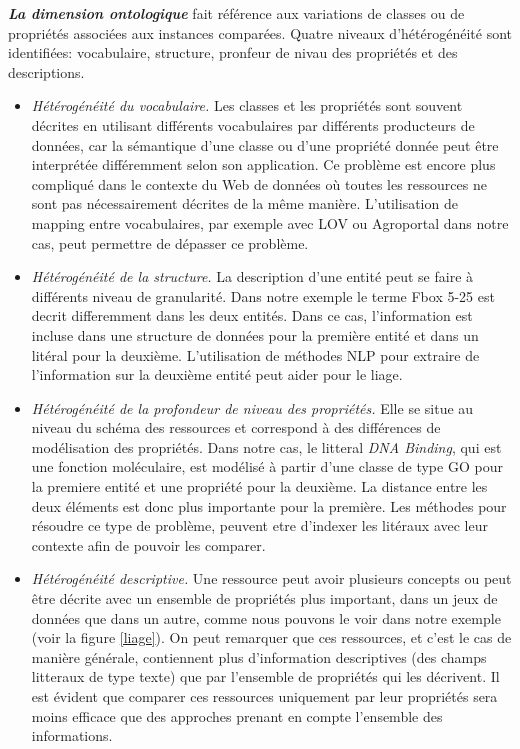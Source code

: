 \textbf{\textit{La dimension ontologique}} fait référence aux variations de classes ou de propriétés associées aux instances comparées. Quatre niveaux d'hétérogénéité sont identifiées: vocabulaire, structure, pronfeur de nivau des propriétés et des descriptions.\\
\begin{itemize}
\item \textit{Hétérogénéité du vocabulaire.} Les classes et les propriétés sont souvent décrites en utilisant différents vocabulaires par différents producteurs de données, car la sémantique d'une classe ou d'une propriété donnée peut être interprétée différemment selon son application. Ce problème est encore plus compliqué dans le contexte du Web de données où toutes les ressources ne sont pas nécessairement décrites de la même manière. L'utilisation de mapping entre vocabulaires, par exemple avec LOV ou Agroportal dans notre cas, peut permettre de dépasser ce problème.\\
\item \textit{Hétérogénéité de la structure.} La description d'une entité peut se faire à différents niveau de granularité. Dans notre exemple le terme Fbox 5-25 est decrit differemment dans les deux entités. Dans ce cas, l'information est incluse dans une structure de données pour la première entité et dans un litéral pour la deuxième. L'utilisation de méthodes NLP pour extraire de l'information sur la deuxième entité peut aider pour le liage.\\
\item \textit{Hétérogénéité de la profondeur de niveau des propriétés.} Elle se situe au niveau du schéma des ressources et correspond à des différences de modélisation des propriétés. Dans notre cas, le litteral \textit{DNA Binding}, qui est une fonction moléculaire, est modélisé à partir d'une classe de type GO pour la premiere entité et une propriété pour la deuxième. La distance entre les deux éléments est donc plus importante pour la première. Les méthodes pour résoudre ce type de problème, peuvent etre d'indexer les litéraux avec leur contexte afin de pouvoir les comparer.\\
\item \textit{Hétérogénéité descriptive.} Une ressource peut avoir plusieurs concepts ou peut être décrite avec un ensemble de propriétés plus important, dans un jeux de données que dans un autre, comme nous pouvons le voir dans notre exemple (voir la figure \ref{liage}). On peut remarquer que ces ressources, et c'est le cas de manière générale, contiennent plus d'information descriptives (des champs litteraux de type texte) que par l'ensemble de propriétés qui les décrivent. Il est évident que comparer ces ressources uniquement par leur propriétés sera moins efficace que des approches prenant en compte l'ensemble des informations. \\

\end{itemize}

